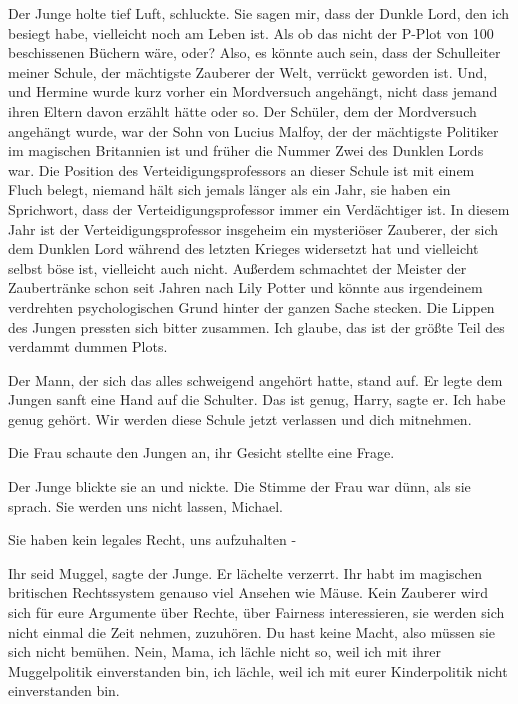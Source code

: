 Der Junge holte tief Luft, schluckte. \glqq{}Sie sagen mir, dass der Dunkle Lord,
den ich besiegt habe, vielleicht noch am Leben ist. Als ob das nicht der P-Plot
von 100 beschissenen Büchern wäre, oder? Also, es könnte auch sein, dass der
Schulleiter meiner Schule, der mächtigste Zauberer der Welt, verrückt geworden ist.
Und, und Hermine wurde kurz vorher ein Mordversuch angehängt, nicht dass jemand
ihren Eltern davon erzählt hätte oder so. Der Schüler, dem der Mordversuch
angehängt wurde, war der Sohn von Lucius Malfoy, der der mächtigste Politiker im
magischen Britannien ist und früher die Nummer Zwei des Dunklen Lords war. Die
Position des Verteidigungsprofessors an dieser Schule ist mit einem Fluch
belegt, niemand hält sich jemals länger als ein Jahr, sie haben ein Sprichwort,
dass der Verteidigungsprofessor immer ein Verdächtiger ist. In diesem Jahr ist
der Verteidigungsprofessor insgeheim ein mysteriöser Zauberer, der sich dem
Dunklen Lord während des letzten Krieges widersetzt hat und vielleicht selbst
böse ist, vielleicht auch nicht. Außerdem schmachtet der Meister der
Zaubertränke schon seit Jahren nach Lily Potter und könnte aus irgendeinem
verdrehten psychologischen Grund hinter der ganzen Sache stecken.\grqq{} Die
Lippen des Jungen pressten sich bitter zusammen. \glqq{}Ich glaube, das ist der
größte Teil des verdammt dummen Plots.\grqq{}

Der Mann, der sich das alles schweigend angehört hatte, stand auf. Er legte dem
Jungen sanft eine Hand auf die Schulter. \glqq{}Das ist genug, Harry\grqq{},
sagte er. \glqq{}Ich habe genug gehört. Wir werden diese Schule jetzt verlassen
und dich mitnehmen.\grqq{}

Die Frau schaute den Jungen an, ihr Gesicht stellte eine Frage.

Der Junge blickte sie an und nickte. Die Stimme der Frau war dünn, als sie
sprach. \glqq{}Sie werden uns nicht lassen, Michael.\grqq{}

\glqq{}Sie haben kein legales Recht, uns aufzuhalten -\grqq{}

\glqq{}Ihr seid Muggel\grqq{}, sagte der Junge. Er lächelte verzerrt. \glqq{}Ihr
habt im magischen britischen Rechtssystem genauso viel Ansehen wie Mäuse. Kein
Zauberer wird sich für eure Argumente über Rechte, über Fairness interessieren,
sie werden sich nicht einmal die Zeit nehmen, zuzuhören. Du hast keine Macht,
also müssen sie sich nicht bemühen. Nein, Mama, ich lächle nicht so, weil ich mit
ihrer Muggelpolitik einverstanden bin, ich lächle, weil ich mit eurer
Kinderpolitik nicht einverstanden bin.\grqq{}

